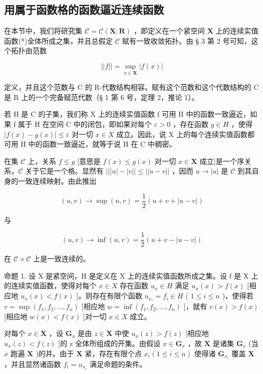 \subsection{用属于函数格的函数逼近连续函数}

在本节中，我们将研究集 \(\mathcal{C} = \mathcal{C}(\mathbf{X};\mathbf{R})\) ，即定义在一个紧空间 \(\mathbf{X}\) 上的连续实值函数(*)全体所成之集，并且总假定 \(\mathcal{C}\) 赋有一致收敛拓扑。由 § 3 第 2 号可知，这个拓扑由范数

\[
| | f | | = \sup _ {x \in \mathbf {X}} | f (x) |
\]

定义，并且这个范数与 C 的 R-代数结构相容。赋有这个范数和这个代数结构的 C 是 R 上的一个完备赋范代数（§ 1 第 6 号，定理 2，推论 1）。

若 H 是 C 的子集，我们称 X 上的连续实值函数 f 可用 H 中的函数一致逼近，如果 f 属于 H 在空间 C 中的闭包，即如果对每个 \(\varepsilon > 0\) ，存在函数 \(g \in H\) ，使得 \(|f(x) - g(x)| \leqslant \varepsilon\) 对一切 \(x \in X\) 成立。因此，说 X 上的每个连续实值函数都可用 H 中的函数一致逼近，就等于说 H 在 C 中稠密。

在集 \(\mathcal{C}\) 上，关系 \(f \leqslant g\) {[}意思是 \(f(x) \leqslant g(x)\) 对一切 \(x \in \mathbf{X}\) 成立{]}是一个序关系，\(\mathcal{C}\) 关于它是一个格。显然有 \(|||u| - |v|| \leqslant ||u - v||\) ，因而 \(u \to |u|\) 是 \(\mathcal{C}\) 到其自身的一致连续映射。由此推出

\[
(u, v) \rightarrow \sup (u, v) = \frac {1}{2} (u + v + | u - v |)
\]

与

\[
(u, v) \rightarrow \inf (u, v) = \frac {1}{2} (u + v - | u - v |)
\]

在 \(\mathcal{C} \times \mathcal{C}\) 上是一致连续的。

命题 1. 设 X 是紧空间，H 是定义在 X 上的连续实值函数所成之集。设 f 是 X 上的连续实值函数，使得对每个 \(x \in X\) 存在函数 \(u_x \in H\) 满足 \(u_x(x) > f(x)\) {[}相应地 \(u_x(x) < f(x)\) {]}。则存在有限个函数 \(u_{x_i} = f_i \in H\) ( \(1 \leqslant i \leqslant n\) )，使得若 \(v = \sup(f_1, f_2, \ldots, f_n)\) {[}相应地 \(w = \inf(f_1, f_2, \ldots, f_n)\) {]}，就有 \(v(x) > f(x)\) {[}相应地 \(w(x) < f(x)\) {]}对一切 \(x \in X\) 成立。

对每个 \(x \in \mathbf{X}\) ，设 \(\mathbf{G}_x\) 是由 \(z \in \mathbf{X}\) 中使 \(u_x(z) > f(z)\) {[}相应地 \(u_x(z) < f(z)\) {]}的 z 全体所组成的开集。由假设 \(x \in \mathbf{G}_x\) ，故 \(\mathbf{X}\) 是诸集 \(\mathbf{G}_x\) (当 \(x\) 跑遍 \(\mathbf{X}\) )的并。由于 \(\mathbf{X}\) 紧，存在有限个点 \(x_i (1 \leqslant i \leqslant n)\) 使得诸 \(\mathbf{G}_{x_i}\) 覆盖 \(\mathbf{X}\) ，并且显然诸函数 \(f_i = u_{x_i}\) 满足命题的条件。

